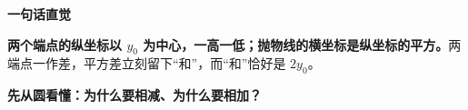 \begin{explanationbox}
\par\par\medskip
\begin{minipage}{\linewidth}
\noindent
\textbf{\textcolor{CExplanation}{一句话直觉}}\par\nobreak\smallskip
\par\noindent\textbf{两个端点的纵坐标以 $y_0$ 为中心，一高一低；抛物线的横坐标是纵坐标的平方。}两端点一作差，平方差立刻留下“和”，而“和”恰好是 $2y_0$。\par
\end{minipage}
\par

\par\medskip
\begin{minipage}{\linewidth}
\noindent
\textbf{\textcolor{CExplanation}{先从圆看懂：为什么要相减、为什么要相加？}}\par\nobreak\smallskip
\par
\begin{minipage}{\linewidth}
\begin{center}
\resizebox{0.78\linewidth}{!}{}
\end{center}
\end{minipage}\par
\end{minipage}
\par

\par


\end{explanationbox}
